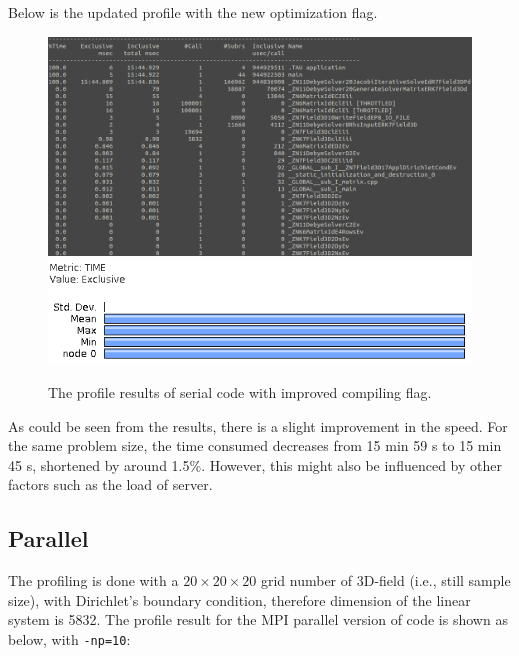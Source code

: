 \documentclass{article}
\begin{document}
\begin{spacing}{1.1}
Below is the updated profile with the new optimization flag.

\begin{figure}[H]
  \centering
  \includegraphics[width=\linewidth]{output/serial-improved-text.png}
  \includegraphics[width=0.6\linewidth]{output/serial-improved.png}
  \caption{The profile results of serial code with improved compiling flag.}
  \label{fig-testcase}
\end{figure}

As could be seen from the results, there is a slight improvement in the speed. For the same problem size, the time consumed decreases from 15 min 59 s to 15 min 45 s, shortened by around 1.5\%. However, this might also be influenced by other factors such as the load of server.

\subsection{Parallel}

The profiling is done with a $ 20\times 20 \times 20$ grid number of 3D-field (i.e., still sample size), with Dirichlet's boundary condition, therefore dimension of the linear system is 5832. The profile result for the MPI parallel version of code is shown as below, with \texttt{-np=10}:


\end{spacing}
\end{document}
